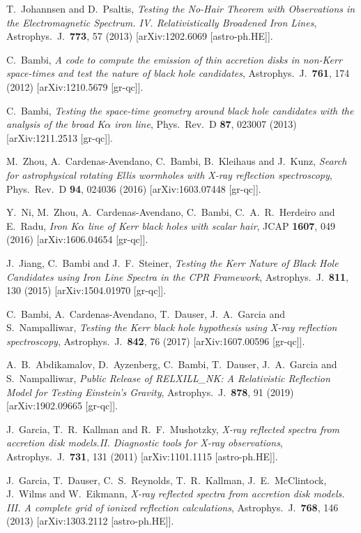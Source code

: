 \documentclass[11pt,a4paper,pdftex]{article}
\begin{document}
\begin{thebibliography}{99}
  T.~Johannsen and D.~Psaltis,
  {\it Testing the No-Hair Theorem with Observations in the Electromagnetic Spectrum. IV. Relativistically Broadened Iron Lines},
  Astrophys.\ J.\  {\bf 773}, 57 (2013)
  [arXiv:1202.6069 [astro-ph.HE]].  
  
  C.~Bambi,
  {\it A code to compute the emission of thin accretion disks in non-Kerr space-times and test the nature of black hole candidates},
  Astrophys.\ J.\  {\bf 761}, 174 (2012)
  [arXiv:1210.5679 [gr-qc]].  
  
  C.~Bambi,
  {\it Testing the space-time geometry around black hole candidates with the analysis of the broad K$\alpha$ iron line},
  Phys.\ Rev.\ D {\bf 87}, 023007 (2013)
  [arXiv:1211.2513 [gr-qc]].  
  
  M.~Zhou, A.~Cardenas-Avendano, C.~Bambi, B.~Kleihaus and J.~Kunz,
  {\it Search for astrophysical rotating Ellis wormholes with X-ray reflection spectroscopy},
  Phys.\ Rev.\ D {\bf 94}, 024036 (2016)
  [arXiv:1603.07448 [gr-qc]].
  
  Y.~Ni, M.~Zhou, A.~Cardenas-Avendano, C.~Bambi, C.~A.~R.~Herdeiro and E.~Radu,
  {\it Iron K$\alpha$ line of Kerr black holes with scalar hair},
  JCAP {\bf 1607}, 049 (2016)
  [arXiv:1606.04654 [gr-qc]].    
  
  J.~Jiang, C.~Bambi and J.~F.~Steiner,
  {\it Testing the Kerr Nature of Black Hole Candidates using Iron Line Spectra in the CPR Framework},
  Astrophys.\ J.\  {\bf 811}, 130 (2015)
  [arXiv:1504.01970 [gr-qc]].
  
  C.~Bambi, A.~Cardenas-Avendano, T.~Dauser, J.~A.~Garcia and S.~Nampalliwar,
  {\it Testing the Kerr black hole hypothesis using X-ray reflection spectroscopy},
  Astrophys.\ J.\  {\bf 842}, 76 (2017)
  [arXiv:1607.00596 [gr-qc]].  
  
  A.~B.~Abdikamalov, D.~Ayzenberg, C.~Bambi, T.~Dauser, J.~A.~Garcia and S.~Nampalliwar,
  {\it Public Release of RELXILL\_NK: A Relativistic Reflection Model for Testing Einstein’s Gravity},
  Astrophys.\ J.\  {\bf 878}, 91 (2019)
  [arXiv:1902.09665 [gr-qc]].    
  
  J.~Garcia, T.~R.~Kallman and R.~F.~Mushotzky,
  {\it X-ray reflected spectra from accretion disk models.II. Diagnostic tools for X-ray observations},
  Astrophys.\ J.\  {\bf 731}, 131 (2011)
  [arXiv:1101.1115 [astro-ph.HE]].

  J.~Garcia, T.~Dauser, C.~S.~Reynolds, T.~R.~Kallman, J.~E.~McClintock, J.~Wilms and W.~Eikmann,
  {\it X-ray reflected spectra from accretion disk models. III. A complete grid of ionized reflection calculations},
  Astrophys.\ J.\  {\bf 768}, 146 (2013)
  [arXiv:1303.2112 [astro-ph.HE]].


\end{thebibliography}
\end{document}

